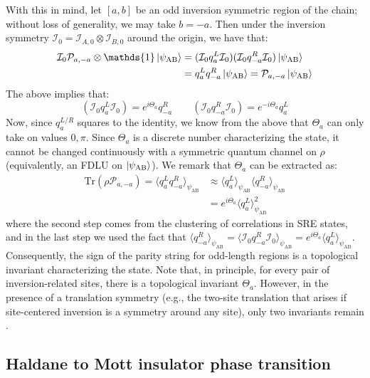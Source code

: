 \documentclass[preprint,superscriptaddress,floatfix, nofootinbib]{revtex4-2}
\begin{document}
With this in mind, let $[a, b]$ be an odd inversion symmetric region of the chain; without loss of generality, we may take $b = -a$.
%
Then under the inversion symmetry $\mathcal{I}_0 = \mathcal{I}_{A, 0} \otimes \mathcal{I}_{B, 0}$ around the origin, we have that:
\begin{align}
    \mathcal{I}_{0} \mathcal{P}_{a, -a} \otimes \mathds{1} \ket{\psi_{\text{AB}}} &= (\mathcal{I}_0 q_{a}^L \mathcal{I}_0)(\mathcal{I}_0 q_{-a}^R \mathcal{I}_0) \ket{\psi_{\text{AB}}} \nonumber\\
    &= q_{a}^L q_{-a}^{R}\ket{\psi_{\text{AB}}} = \mathcal{P}_{a,-a} \ket{\psi_{\text{AB}}}
\end{align}
The above implies that: 
\begin{equation}
     (\mathcal{I}_0 q_{a}^L \mathcal{I}_0) = e^{i \Theta_a} q_{-a}^{R} \qquad (\mathcal{I}_0 q_{-a}^R \mathcal{I}_0) = e^{-i \Theta_a} q_{a}^{L}
\end{equation}
Now, since $q_a^{L/R}$ squares to the identity, we know from the above that $\Theta_a$ can only take on values $0, \pi$.
%
Since $\Theta_a$ is a discrete number characterizing the state, it cannot be changed continuously with a symmetric quantum channel on $\rho$ (equivalently, an FDLU on $\ket{\psi_{\text{AB}}}$).
%
We remark that $\Theta_a$ can be extracted as: 
\begin{align}
    \text{Tr}\left(\rho \mathcal{P}_{a, -a} \right) = \langle q_a^L q_{-a}^R \rangle_{\psi_{\text{AB}}} &\approx \langle q^L_a \rangle_{\psi_{\text{AB}}} \langle q^R_{-a} \rangle_{\psi_{\text{AB}}}\\
    &= e^{i \Theta_a} \langle q_a^L \rangle^2_{\psi_{\text{AB}}}
\end{align}
where the second step comes from the clustering of correlations in SRE states, and in the last step we used the fact that $\langle q_{-a}^R \rangle_{\psi_{\text{AB}}} = \langle \mathcal{I}_0 q_{-a}^R \mathcal{I}_0 \rangle_{\psi_{\text{AB}}} = e^{i \Theta_a} \langle q_a^{L} \rangle_{\psi_{\text{AB}}}$.
%
Consequently, the sign of the parity string for odd-length regions is a topological invariant characterizing the state.
%
Note that, in principle, for every pair of inversion-related sites, there is a topological invariant $\Theta_a$.
%
However, in the presence of a translation symmetry (e.g., the two-site translation that arises if site-centered inversion is a symmetry around any site), only two invariants remain \cite{Sahay2025}.


\subsection*{Haldane to Mott insulator phase transition}
\end{document}

